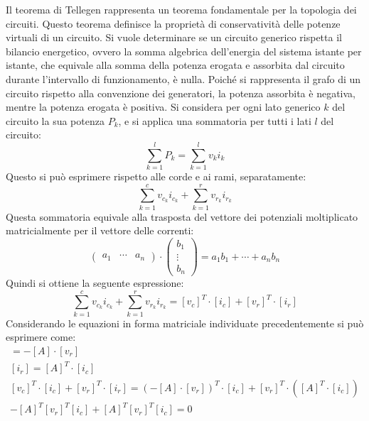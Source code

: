 \documentclass{article}
\numberwithin{equation}{subsection}
\begin{document}
Il teorema di Tellegen rappresenta un teorema fondamentale per la topologia dei circuiti. Questo teorema definisce la proprietà di conservatività delle potenze virtuali 
di un circuito. 
Si vuole determinare se un circuito generico rispetta il bilancio energetico, ovvero la somma algebrica dell'energia del sistema istante per istante, che equivale alla 
somma della potenza erogata e assorbita dal circuito durante l'intervallo di funzionamento, è nulla. Poiché si rappresenta il grafo di un circuito rispetto alla convenzione 
dei generatori, la potenza assorbita è negativa, mentre la potenza erogata è positiva. 
Si considera per ogni lato generico $k$ del circuito la sua potenza $P_k$, e si applica una sommatoria per tutti i lati $l$ del circuito:
\begin{equation*}
    \displaystyle\sum_{k=1}^lP_k=\sum_{k=1}^lv_ki_k
\end{equation*}
Questo si può esprimere rispetto alle corde e ai rami, separatamente:
\begin{equation*}
    \displaystyle\sum_{k=1}^cv_{c_k}i_{c_k}+\sum_{k=1}^rv_{r_k}i_{r_k}
\end{equation*}
Questa sommatoria equivale alla trasposta del vettore dei potenziali moltiplicato matricialmente per il vettore delle correnti:
\begin{equation*}
    \begin{pmatrix}
        a_1&\cdots&a_n
    \end{pmatrix}\cdot\begin{pmatrix}
        b_1\\
        \vdots\\
        b_n
    \end{pmatrix}=a_1b_1+\cdots +a_nb_n
\end{equation*}
Quindi si ottiene la seguente espressione:
\begin{equation*}
    \displaystyle\sum_{k=1}^cv_{c_k}i_{c_k}+\sum_{k=1}^rv_{r_k}i_{r_k}=[v_c]^T\cdot[i_c]+[v_r]^T\cdot[i_r]    
\end{equation*}
Considerando le equazioni in forma matriciale individuate precedentemente si può esprimere come:
\begin{gather*}
    [v_c]=-[A]\cdot[v_r]\\
    [i_r]=[A]^T\cdot[i_c]\\
    [v_c]^T\cdot[i_c]+[v_r]^T\cdot[i_r]=\left(-[A]\cdot[v_r]\right)^T\cdot[i_c]+[v_r]^T\cdot\left([A]^T\cdot[i_c]\right)\\
    -[A]^T[v_r]^T[i_c]+[A]^T[v_r]^T[i_c]=0
\end{gather*}
\end{document}
